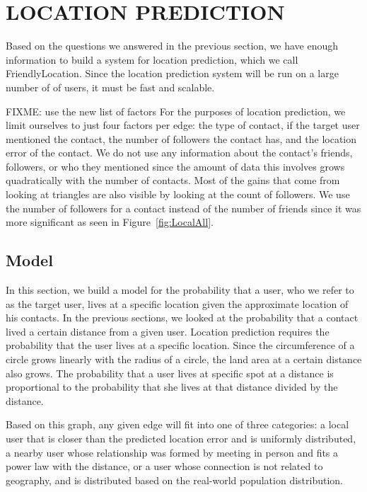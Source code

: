 \chapter{\uppercase{Location Prediction}}

Based on the questions we answered in the previous section, we have enough
information to build a system for location prediction, which we call
FriendlyLocation.
Since the location prediction system will be run on a large number of of users,
it must be fast and scalable.

FIXME: use the new list of factors
For the purposes of location prediction, we limit ourselves to just four
factors per edge: the type of contact, if the target user mentioned the
contact, the number of followers the contact has, and the location error of the
contact.
We do not use any information about the contact's friends, followers, or who
they mentioned since the amount of data this involves grows quadratically with
the number of contacts.
Most of the gains that come from looking at triangles are also visible by
looking at the count of followers.
We use the number of followers for a contact instead of the number of friends
since it was more significant as seen in Figure~\ref{fig:LocalAll}.

\section{Model}
\label{sec:model}

In this section, we build a model for the probability that a user, who we refer
to as the target user, lives at a specific location given the approximate
location of his contacts.
In the previous sections, we looked at the probability that a contact lived a
certain distance from a given user.
Location prediction requires the probability that the user lives at a specific
location.
Since the circumference of a circle grows linearly with the radius of a circle,
the land area at a certain distance also grows.
The probability that a user lives at specific spot at a distance is
proportional to the probability that she lives at that distance divided by the
distance.

Based on this graph, any given edge will fit into one of three categories: a
local user that is closer than the predicted location error and is uniformly
distributed, a nearby user whose relationship was formed by meeting in person
and fits a power law with the distance, or a user whose connection is not
related to geography, and is distributed based on the real-world population
distribution.


